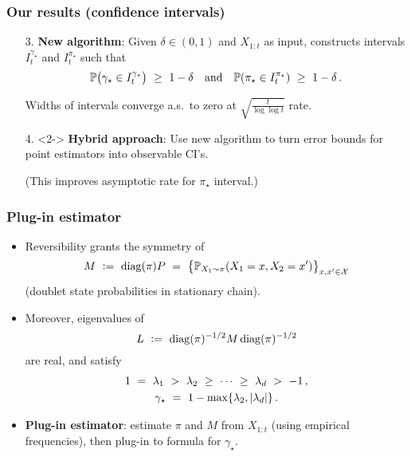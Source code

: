 \documentclass[11pt,compress,blue4]{beamer}
\newcommand\fns\footnotesize
\newcommand\pimin{\ensuremath{\pi_{\star}}}
\newcommand\gap{\ensuremath{\gamma_{\star}}}
\newcommand\states{\ensuremath{\mathcal{X}}}
\begin{document}
\begin{frame}
  \frametitle{Our results (confidence intervals)}

  \begin{enumerate}
    \item[3.]
      \textbf{New algorithm}:
      Given $\delta \in (0,1)$ and $X_{1:t}$ as input, constructs
      intervals $I_t^{\gap}$ and $I_t^{\pimin}$ such that
      \[
        \P\Parens{
          \gap \in I_t^{\gap}
        }
        \ \geq \ 1-\delta
        \quad
        \text{and}
        \quad
        \P\Parens{
          \pimin \in I_t^{\pimin}
        }
        \ \geq \ 1-\delta
        \,.
      \]

      Widths of intervals converge a.s.~to zero at
      $\sqrt{\frac{t}{\log\log t}}$ rate.

      \medskip

    \item[4.]<2->
      \textbf{Hybrid approach}:
      Use new algorithm to turn error bounds for point estimators into
      observable CI's.

      {\fns(This improves asymptotic rate for $\pimin$ interval.)}

  \end{enumerate}

\end{frame}


\begin{frame}
  \frametitle{Plug-in estimator}

  \begin{itemize}
    \item<2->
      Reversibility grants the symmetry of
      \[
        M
        \ := \
        \diag(\pi) P
        \ = \
        \Braces{ \P_{X_1 \sim \pi}(X_1=x,X_2=x') }_{x,x'\in\states}
      \]
      {\fns(doublet state probabilities in stationary chain)}.

      \smallskip

    \item<3->
      Moreover, eigenvalues of
      \[
        L
        \ := \
        \operatorname{diag}(\pi)^{-1/2} M \operatorname{diag}(\pi)^{-1/2}
      \]
      are real, and satisfy
      \begin{gather*}
        1
        \ = \ \lambda_1 \ > \ \lambda_2 \ \geq \ \dotsb \ \geq \
        \lambda_d \ > \ -1
        \,,
        \\
        \gap
        \ = \ 1 - \max\braces{ \lambda_2, \abs{\lambda_d} }
        \,.
      \end{gather*}

      \smallskip

    \item<4->
      \textbf{Plug-in estimator}:
      estimate $\pi$ and $M$ from $X_{1:t}$ (using empirical
      frequencies), then plug-in to formula for $\gap$.

  \end{itemize}

\end{frame}
\end{document}
